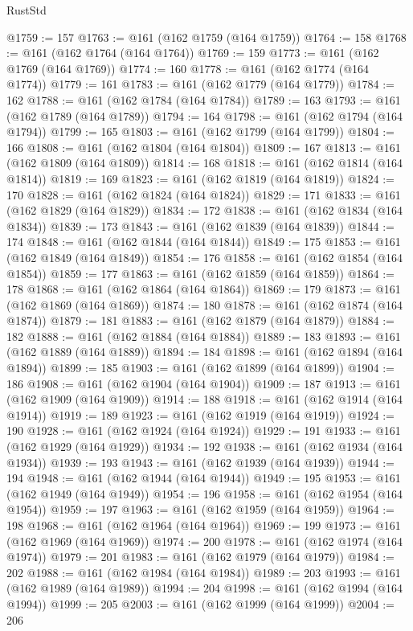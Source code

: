 \begin{lexlean}{RustStd}
\begin{coremodule}
@1759 := 157
@1763 := @161 (@162 @1759 (@164 @1759))
@1764 := 158
@1768 := @161 (@162 @1764 (@164 @1764))
@1769 := 159
@1773 := @161 (@162 @1769 (@164 @1769))
@1774 := 160
@1778 := @161 (@162 @1774 (@164 @1774))
@1779 := 161
@1783 := @161 (@162 @1779 (@164 @1779))
@1784 := 162
@1788 := @161 (@162 @1784 (@164 @1784))
@1789 := 163
@1793 := @161 (@162 @1789 (@164 @1789))
@1794 := 164
@1798 := @161 (@162 @1794 (@164 @1794))
@1799 := 165
@1803 := @161 (@162 @1799 (@164 @1799))
@1804 := 166
@1808 := @161 (@162 @1804 (@164 @1804))
@1809 := 167
@1813 := @161 (@162 @1809 (@164 @1809))
@1814 := 168
@1818 := @161 (@162 @1814 (@164 @1814))
@1819 := 169
@1823 := @161 (@162 @1819 (@164 @1819))
@1824 := 170
@1828 := @161 (@162 @1824 (@164 @1824))
@1829 := 171
@1833 := @161 (@162 @1829 (@164 @1829))
@1834 := 172
@1838 := @161 (@162 @1834 (@164 @1834))
@1839 := 173
@1843 := @161 (@162 @1839 (@164 @1839))
@1844 := 174
@1848 := @161 (@162 @1844 (@164 @1844))
@1849 := 175
@1853 := @161 (@162 @1849 (@164 @1849))
@1854 := 176
@1858 := @161 (@162 @1854 (@164 @1854))
@1859 := 177
@1863 := @161 (@162 @1859 (@164 @1859))
@1864 := 178
@1868 := @161 (@162 @1864 (@164 @1864))
@1869 := 179
@1873 := @161 (@162 @1869 (@164 @1869))
@1874 := 180
@1878 := @161 (@162 @1874 (@164 @1874))
@1879 := 181
@1883 := @161 (@162 @1879 (@164 @1879))
@1884 := 182
@1888 := @161 (@162 @1884 (@164 @1884))
@1889 := 183
@1893 := @161 (@162 @1889 (@164 @1889))
@1894 := 184
@1898 := @161 (@162 @1894 (@164 @1894))
@1899 := 185
@1903 := @161 (@162 @1899 (@164 @1899))
@1904 := 186
@1908 := @161 (@162 @1904 (@164 @1904))
@1909 := 187
@1913 := @161 (@162 @1909 (@164 @1909))
@1914 := 188
@1918 := @161 (@162 @1914 (@164 @1914))
@1919 := 189
@1923 := @161 (@162 @1919 (@164 @1919))
@1924 := 190
@1928 := @161 (@162 @1924 (@164 @1924))
@1929 := 191
@1933 := @161 (@162 @1929 (@164 @1929))
@1934 := 192
@1938 := @161 (@162 @1934 (@164 @1934))
@1939 := 193
@1943 := @161 (@162 @1939 (@164 @1939))
@1944 := 194
@1948 := @161 (@162 @1944 (@164 @1944))
@1949 := 195
@1953 := @161 (@162 @1949 (@164 @1949))
@1954 := 196
@1958 := @161 (@162 @1954 (@164 @1954))
@1959 := 197
@1963 := @161 (@162 @1959 (@164 @1959))
@1964 := 198
@1968 := @161 (@162 @1964 (@164 @1964))
@1969 := 199
@1973 := @161 (@162 @1969 (@164 @1969))
@1974 := 200
@1978 := @161 (@162 @1974 (@164 @1974))
@1979 := 201
@1983 := @161 (@162 @1979 (@164 @1979))
@1984 := 202
@1988 := @161 (@162 @1984 (@164 @1984))
@1989 := 203
@1993 := @161 (@162 @1989 (@164 @1989))
@1994 := 204
@1998 := @161 (@162 @1994 (@164 @1994))
@1999 := 205
@2003 := @161 (@162 @1999 (@164 @1999))
@2004 := 206

\end{coremodule}
\end{lexlean}
